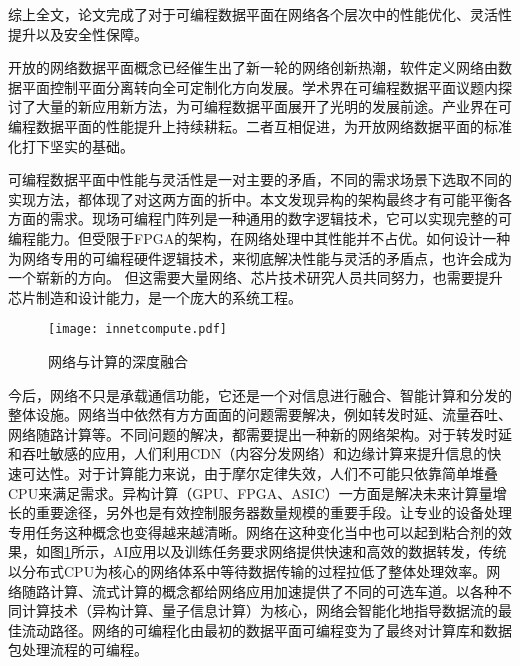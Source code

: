 综上全文，论文完成了对于可编程数据平面在网络各个层次中的性能优化、灵活性提升以及安全性保障。





\label{chap62}

\label{chap621}

开放的网络数据平面概念已经催生出了新一轮的网络创新热潮，软件定义网络由数据平面控制平面分离转向全可定制化方向发展。学术界在可编程数据平面议题内探讨了大量的新应用新方法，为可编程数据平面展开了光明的发展前途。产业界在可编程数据平面的性能提升上持续耕耘。二者互相促进，为开放网络数据平面的标准化打下坚实的基础。

可编程数据平面中性能与灵活性是一对主要的矛盾，不同的需求场景下选取不同的实现方法，都体现了对这两方面的折中。本文发现异构的架构最终才有可能平衡各方面的需求。现场可编程门阵列是一种通用的数字逻辑技术，它可以实现完整的可编程能力。但受限于FPGA的架构，在网络处理中其性能并不占优。如何设计一种为网络专用的可编程硬件逻辑技术，来彻底解决性能与灵活的矛盾点，也许会成为一个崭新的方向。
但这需要大量网络、芯片技术研究人员共同努力，也需要提升芯片制造和设计能力，是一个庞大的系统工程。




\label{chap622}

\begin{figure}[!ht]
	\centering 
	\texttt{[image: innetcompute.pdf]}
	\caption{网络与计算的深度融合} \label{fig:innetcompute}
\end{figure}

今后，网络不只是承载通信功能，它还是一个对信息进行融合、智能计算和分发的整体设施。网络当中依然有方方面面的问题需要解决，例如转发时延、流量吞吐、网络随路计算等。不同问题的解决，都需要提出一种新的网络架构。对于转发时延和吞吐敏感的应用，人们利用CDN（内容分发网络）和边缘计算来提升信息的快速可达性。对于计算能力来说，由于摩尔定律失效，人们不可能只依靠简单堆叠CPU来满足需求。异构计算（GPU、FPGA、ASIC）一方面是解决未来计算量增长的重要途径，另外也是有效控制服务器数量规模的重要手段。让专业的设备处理专用任务这种概念也变得越来越清晰。网络在这种变化当中也可以起到粘合剂的效果，如图\ref{fig:innetcompute}所示，AI应用以及训练任务要求网络提供快速和高效的数据转发，传统以分布式CPU为核心的网络体系中等待数据传输的过程拉低了整体处理效率。网络随路计算、流式计算的概念都给网络应用加速提供了不同的可选车道。以各种不同计算技术（异构计算、量子信息计算）为核心，网络会智能化地指导数据流的最佳流动路径。网络的可编程化由最初的数据平面可编程变为了最终对计算库和数据包处理流程的可编程。










